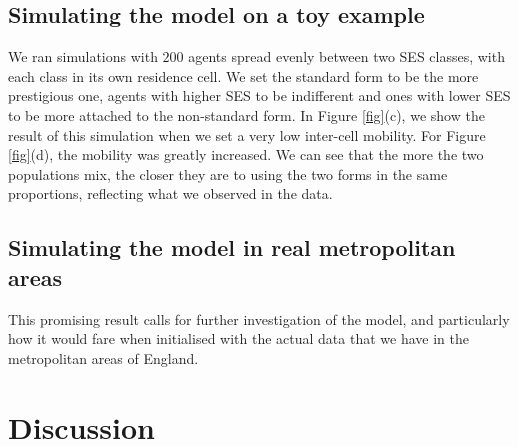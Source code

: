\documentclass[../thesis.tex]{subfiles}
\begin{document}
\subsection{Simulating the model on a toy example}
We ran simulations with $200$ agents spread evenly between two SES classes,
with each class in its own residence cell. We set the standard form to be the more
prestigious one, agents with higher SES to be indifferent and ones with lower SES to be
more attached to the non-standard form. In Figure \ref{fig}(c), we show the result of
this simulation when we set a very low inter-cell mobility. For Figure \ref{fig}(d), the
mobility was greatly increased. We can see that the more the two populations mix, the
closer they are to using the two forms in the same proportions, reflecting what we
observed in the data.


\subsection{Simulating the model in real metropolitan areas}
This promising result calls for further investigation of the
model, and particularly how it would fare when initialised with the actual data that we
have in the metropolitan areas of England.


\section{Discussion}
\end{document}
